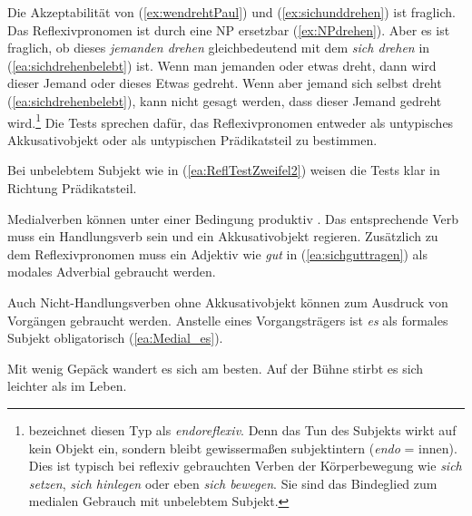 Die Akzeptabilität von (\ref{ex:wendrehtPaul}) und (\ref{ex:sichunddrehen}) ist fraglich. Das Reflexivpronomen ist durch eine NP ersetzbar (\ref{ex:NPdrehen}). Aber es ist fraglich, ob dieses \textit{jemanden drehen} gleichbedeutend mit dem \textit{sich drehen} in (\ref{ea:sichdrehenbelebt}) ist. Wenn man jemanden oder etwas dreht, dann wird dieser Jemand oder dieses Etwas gedreht. Wenn aber jemand sich selbst dreht (\ref{ea:sichdrehenbelebt}), kann nicht gesagt werden, dass dieser Jemand gedreht wird.\footnote{\citet[28]{Haspelmath1987} bezeichnet diesen Typ als \textit{endoreflexiv}. Denn das Tun des Subjekts wirkt auf kein Objekt ein, sondern bleibt gewissermaßen subjektintern (\textit{endo} =  innen). Dies ist typisch bei reflexiv gebrauchten Verben der Körperbewegung wie \textit{sich setzen}, \textit{sich hinlegen} oder eben \textit{sich bewegen}. Sie sind das Bindeglied zum medialen Gebrauch mit unbelebtem Subjekt.} Die Tests sprechen dafür, das Reflexivpronomen entweder als untypisches Akkusativobjekt oder als untypischen Prädikatsteil zu bestimmen. 

Bei unbelebtem Subjekt wie in (\ref{ea:ReflTestZweifel2}) weisen die Tests klar in Richtung Prädikatsteil.


\ea \label{ea:ReflTestZweifel2}
\label{ea:sichdrehenunbelebt2}
\label{ex:wendrehtPaul2}
\label{ex:sichunddrehen2}
\label{ex:NPdrehen2}
\z 
\z 

Medialverben können unter einer Bedingung produktiv . Das entsprechende Verb muss ein Handlungsverb sein und ein Akkusativobjekt regieren. Zusätzlich zu dem Reflexivpronomen muss ein Adjektiv wie \textit{gut} in (\ref{ea:sichguttragen}) als modales Adverbial gebraucht werden.

\ea \label{ea:Medialkonstruktion} 
\label{ea:sichguttragen} 
\label{ex:*sichtragen}
\z 
\z

Auch Nicht-Handlungsverben ohne Akkusativobjekt können zum Ausdruck von Vorgängen gebraucht werden. Anstelle eines Vorgangsträgers ist \textit{es} als formales Subjekt obligatorisch (\ref{ea:Medial_es}).

\ea\label{ea:Medial_es}
\ea \label{ea:wander_es_sich} Mit wenig Gepäck wandert es sich am besten.
\ex \label{ex:stirbt_es_sich} Auf der Bühne stirbt es sich leichter als im Leben. 
\z 
\z 

